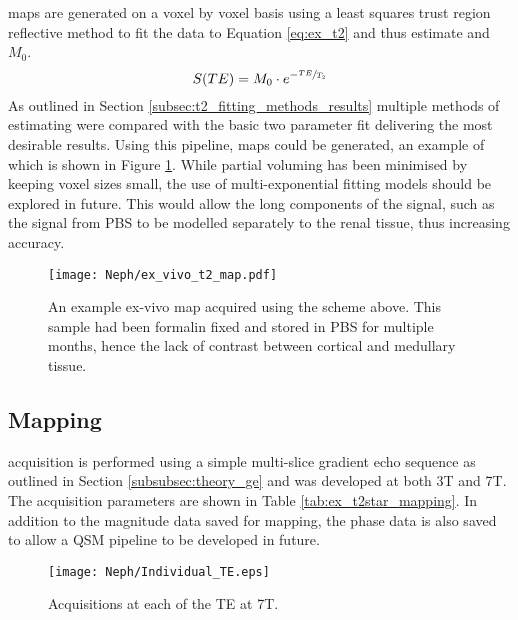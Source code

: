 \ttwo maps are generated on a voxel by voxel basis using a least squares trust region reflective method to fit the data to Equation \eqref{eq:ex_t2} and thus estimate \ttwo and $M_0$. 
\begin{equation}
	S(TE) = M_0 \cdot e^{-\sfrac{TE}{T_2}}
	\label{eq:ex_t2}
\end{equation}
As outlined in Section \ref{subsec:t2_fitting_methods_results} multiple methods of estimating \ttwo were compared with the basic two parameter fit delivering the most desirable results. Using this pipeline, \ttwo maps could be generated, an example of which is shown in Figure \ref{fig:ex_t2_map}. While partial voluming has been minimised by keeping voxel sizes small, the use of multi-exponential fitting models should be explored in future. This would allow the long \ttwo components of the signal, such as the signal from \ac{PBS} to be modelled separately to the renal tissue, thus increasing accuracy.

\begin{figure}[H]
	\centering
	\texttt{[image: Neph/ex\_vivo\_t2\_map.pdf]}
	\caption{An example ex-vivo \ttwo map acquired using the scheme above. This sample had been formalin fixed and stored in \ac{PBS} for multiple months, hence the lack of contrast between cortical and medullary tissue.}
	\label{fig:ex_t2_map}
\end{figure}

\subsection{\ttwostar Mapping}

\ttwostar acquisition is performed using a simple multi-slice gradient echo sequence as outlined in Section \ref{subsubsec:theory_ge} and was developed at both 3T and 7T. The acquisition parameters are shown in Table \ref{tab:ex_t2star_mapping}. In addition to the magnitude data saved for \ttwostar mapping, the phase data is also saved to allow a \ac{QSM} pipeline to be developed in future.

\begin{figure}[H]
	\centering
	\texttt{[image: Neph/Individual\_TE.eps]}
	\caption{Acquisitions at each of the \ac{TE} at 7T.}
	\label{fig:ex_t2star_raw_data}	
\end{figure}

